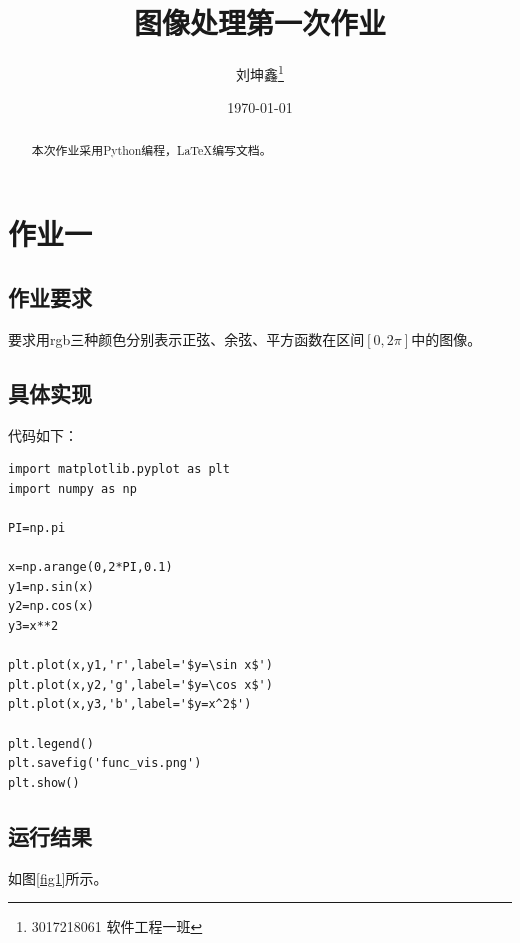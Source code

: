 \documentclass{article}
\begin{document}

\title{图像处理第一次作业}
\author{刘坤鑫\thanks{3017218061 软件工程一班}}
\date{\today}
\maketitle
\begin{abstract}
	本次作业采用Python编程，\LaTeX 编写文档。
\end{abstract}

\section{作业一}

\subsection{作业要求}

要求用rgb三种颜色分别表示正弦、余弦、平方函数在区间$[0,2\pi ]$中的图像。

\subsection{具体实现}

代码如下：

\begin{lstlisting}[title={func\_vis.py}]
import matplotlib.pyplot as plt
import numpy as np

PI=np.pi

x=np.arange(0,2*PI,0.1)
y1=np.sin(x)
y2=np.cos(x)
y3=x**2

plt.plot(x,y1,'r',label='$y=\sin x$')
plt.plot(x,y2,'g',label='$y=\cos x$')
plt.plot(x,y3,'b',label='$y=x^2$')

plt.legend()
plt.savefig('func_vis.png')
plt.show()
\end{lstlisting}

\subsection{运行结果}

如图\ref{fig1}所示。
\end{document}
